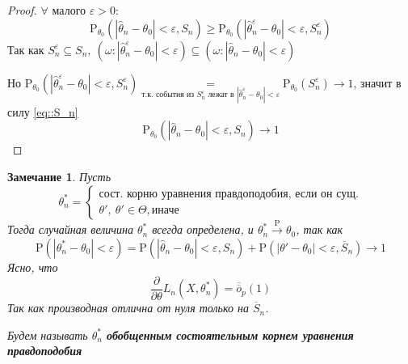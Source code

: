 \documentclass[12pt]{article}
\newtheorem{remark}{Замечание}
\theoremstyle{basic_theorem}
\theoremstyle{name_theorem}
\newcommand\defin[1]{\textbf{#1}}
\def\eps{ \varepsilon }
\def\P{ \mathrm{P} }
\def\littleO{ \overline{\overline{o}} }
\begin{document}
\begin{proof}
        \(\forall \text{ малого } \eps > 0\):
        \begin{equation}
            \label{eq::S_n}
            \P_{\theta_0}(\left\lvert \widehat{\theta}_n - \theta_0 \right\rvert  < \eps, S_n) \geq
            \P_{\theta_0}(\left\lvert \widehat{\theta}^\eps_n - \theta_0 \right\rvert  < \eps, S_n^\eps)
        \end{equation}
        Так как $S^\eps_n \subseteq S_n,\
        (\omega: \left\lvert \widehat{\theta}^\eps_n - \theta_0 \right\rvert  < \eps) \subseteq
        (\omega: \left\lvert \widehat{\theta}_n - \theta_0 \right\rvert  < \eps)$

        Но $\P_{\theta_0}(\left\lvert \widehat{\theta}^\eps_n - \theta_0 \right\rvert  < \eps, S^\eps_n)
        \underset{\text{т.к. события из } S_n^\eps \text{ лежат в } \left\lvert \widehat{\theta}^\eps_n - \theta_0 \right\rvert  < \eps}{=}
        \P_{\theta_0}(S_n^\eps) \rightarrow 1$, значит в силу \eqref{eq::S_n}
        \[\P_{\theta_0} (\left\lvert \widehat{\theta}_n - \theta_0 \right\rvert  < \eps, S_n) \rightarrow 1\]
    \end{proof}

    \begin{remark}
        Пусть
        \[\theta^*_n = \begin{cases}
            \text{сост. корню уравнения правдоподобия, если он сущ.} \\
            \theta',\ \theta'\in\Theta, \text{иначе}
        \end{cases}\]
        Тогда случайная величина \(\theta^*_n\) всегда определена, и
        \(\theta^*_n \xrightarrow{\P} \theta_0\), так как
        \[\P(\left\lvert \theta^*_n - \theta_0 \right\rvert  < \eps) =
        \P(\left\lvert \widehat{\theta}_n - \theta_0 \right\rvert  < \eps, S_n) +
        \P(\left\lvert \theta' - \theta_0 \right\rvert  < \eps, \overline{S}_n) \rightarrow 1\]
        Ясно, что
        \begin{equation}
            \frac{\partial}{\partial\theta} L_n(X, \theta^*_n) = \littleO_p(1)
        \end{equation}
        Так как производная отлична от нуля только на \(\overline{S}_n\).

        Будем называть \(\theta_n^*\) \defin{обобщенным состоятельным корнем уравнения
        правдоподобия}
    \end{remark}
\end{document}
